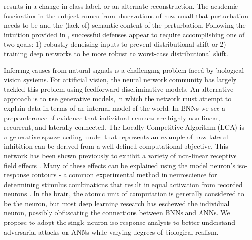 results in a change in class label, or an alternate reconstruction. The academic fascination in the subject comes from observations of how small that perturbation needs to be and the (lack of) semantic content of the perturbation. Following the intuition provided in \cite{ford2019adversarial}, successful defenses appear to require accomplishing one of two goals: 1) robustly denoising inputs to prevent distributional shift or 2) training deep networks to be more robust to worst-case distributional shift.

Inferring causes from natural signals is a challenging problem faced by biological vision systems. For artificial vision, the neural network community has largely tackled this problem using feedforward discriminative models. An alternative approach is to use generative models, in which the network must attempt to explain data in terms of an internal model of the world. In BNNs we see a preponderance of evidence that individual neurons are highly non-linear, recurrent, and laterally connected. The Locally Competitive Algorithm (LCA) \cite{rozell2008sparse} is a generative sparse coding model that represents an example of how lateral inhibition can be derived from a well-defined computational objective. This network has been shown previously to exhibit a variety of non-linear receptive field effects \cite{zhu2013visual}. Many of these effects can be explained using the model neuron’s iso-response contours - a common experimental method in neuroscience for determining stimulus combinations that result in equal activation from recorded neurons \cite{golden2016conjectures}. In the brain, the atomic unit of computation is generally considered to be the neuron, but most deep learning research has eschewed the individual neuron, possibly obfuscating the connections between BNNs and ANNs. We propose to adopt the single-neuron iso-response analysis to better understand adversarial attacks on ANNs while varying degrees of biological realism.

